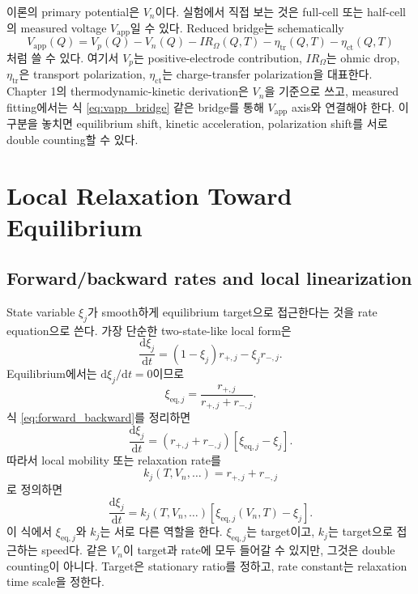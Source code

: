 \documentclass[11pt]{article}
\newcommand{\dd}{\mathrm{d}}
\newcommand{\eq}{\mathrm{eq}}
\newcommand{\app}{\mathrm{app}}
\begin{document}
이론의 primary potential은 \(V_n\)이다. 실험에서 직접 보는 것은 full-cell 또는 half-cell의
measured voltage \(V_{\app}\)일 수 있다. Reduced bridge는 schematically
\begin{equation}
V_{\app}(Q)
=
V_p(Q)-V_n(Q)-I R_{\Omega}(Q,T)-\eta_{\mathrm{tr}}(Q,T)-\eta_{\mathrm{ct}}(Q,T)
\label{eq:vapp_bridge}
\end{equation}
처럼 쓸 수 있다. 여기서 \(V_p\)는 positive-electrode contribution, \(IR_\Omega\)는 ohmic drop,
\(\eta_{\mathrm{tr}}\)은 transport polarization, \(\eta_{\mathrm{ct}}\)는 charge-transfer
polarization을 대표한다. Chapter 1의 thermodynamic-kinetic derivation은 \(V_n\)을 기준으로 쓰고,
measured fitting에서는 식 \eqref{eq:vapp_bridge} 같은 bridge를 통해 \(V_{\app}\) axis와 연결해야
한다. 이 구분을 놓치면 equilibrium shift, kinetic acceleration, polarization shift를 서로
double counting할 수 있다.

\section{Local Relaxation Toward Equilibrium}\label{sec:relax}

\subsection{Forward/backward rates and local linearization}\label{subsec:fb_rates}

State variable \(\xi_j\)가 smooth하게 equilibrium target으로 접근한다는 것을 rate equation으로
쓴다. 가장 단순한 two-state-like local form은
\begin{equation}
\frac{\dd \xi_j}{\dd t}
=
(1-\xi_j)r_{+,j}-\xi_j r_{-,j}.
\label{eq:forward_backward}
\end{equation}
Equilibrium에서는 \(\dd\xi_j/\dd t=0\)이므로
\begin{equation}
\xi_{\eq,j}
=
\frac{r_{+,j}}{r_{+,j}+r_{-,j}}.
\label{eq:stationary_ratio}
\end{equation}
식 \eqref{eq:forward_backward}를 정리하면
\begin{equation}
\frac{\dd \xi_j}{\dd t}
=
(r_{+,j}+r_{-,j})
\left[
\xi_{\eq,j}-\xi_j
\right].
\label{eq:rate_from_ratio}
\end{equation}
따라서 local mobility 또는 relaxation rate를
\begin{equation}
k_j(T,V_n,\ldots)=r_{+,j}+r_{-,j}
\label{eq:k_sum}
\end{equation}
로 정의하면
\begin{equation}
\boxed{
\frac{\dd \xi_j}{\dd t}
=
k_j(T,V_n,\ldots)
\left[
\xi_{\eq,j}(V_n,T)-\xi_j
\right].
}
\label{eq:relax_time}
\end{equation}
이 식에서 \(\xi_{\eq,j}\)와 \(k_j\)는 서로 다른 역할을 한다. \(\xi_{\eq,j}\)는 target이고,
\(k_j\)는 target으로 접근하는 speed다. 같은 \(V_n\)이 target과 rate에 모두 들어갈 수 있지만,
그것은 double counting이 아니다. Target은 stationary ratio를 정하고, rate constant는 relaxation
time scale을 정한다.
\end{document}
